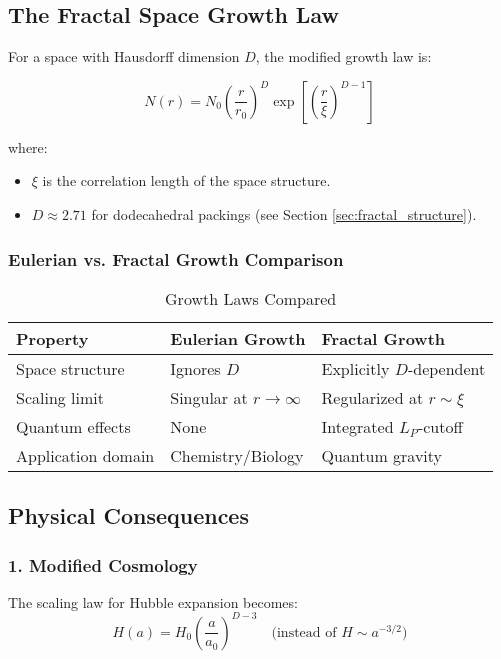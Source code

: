 \subsection{The Fractal Space Growth Law}  
\label{subsec:fractal_growth}  

For a space with Hausdorff dimension $D$, the modified growth law is:  

\begin{equation}  
N(r) = N_0 \left(\frac{r}{r_0}\right)^D \exp\left[\left(\frac{r}{\xi}\right)^{D-1}\right]  
\end{equation}  

where:  
\begin{itemize}  
\item $\xi$ is the correlation length of the space structure.  
\item $D \approx 2.71$ for dodecahedral packings (see Section \ref{sec:fractal_structure}).  
\end{itemize}  

\subsubsection*{Eulerian vs. Fractal Growth Comparison}  

\begin{table}[ht]
\centering  
\caption{Growth Laws Compared}  
\begin{tabular}{lll}  
\toprule  
\textbf{Property} & \textbf{Eulerian Growth} & \textbf{Fractal Growth} \\  
\midrule  
Space structure & Ignores $D$ & Explicitly $D$-dependent \\  
Scaling limit & Singular at $r \to \infty$ & Regularized at $r \sim \xi$ \\  
Quantum effects & None & Integrated $L_P$-cutoff \\  
Application domain & Chemistry/Biology & Quantum gravity \\  
\bottomrule  
\end{tabular}  
\end{table}  

\subsection{Physical Consequences}  
\label{subsec:physical_consequences}  

\subsubsection*{1. Modified Cosmology}  
The scaling law for Hubble expansion becomes:  
\begin{equation}  
H(a) = H_0 \left(\frac{a}{a_0}\right)^{D-3} \quad \text{(instead of } H \sim a^{-3/2} \text{)}  
\end{equation}  

